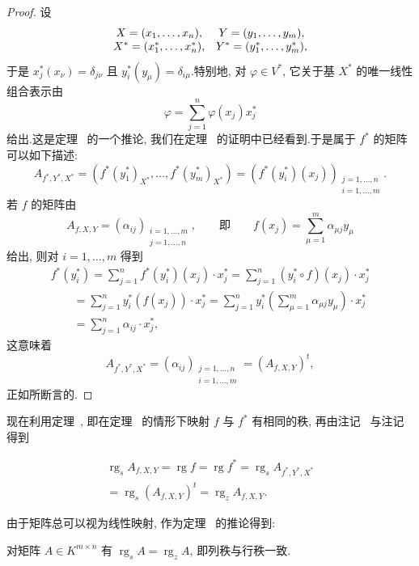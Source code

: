 \begin{proof}
设
\[
\begin{array}{c c}
X = (x_1, \ldots, x_n), & Y = (y_1, \ldots, y_m), \\
X^* = (x_1^*, \ldots, x_n^*), & Y^* = (y_1^*, \ldots, y_m^*),
\end{array}
\]
于是 $x_j^*(x_\nu) = \delta_{j\nu}$ 且 $y_i^*(y_\mu) = \delta_{i\mu}$.特别地, 对 $\varphi \in V^*$, 它关于基 $X^*$ 的唯一线性组合表示由
\[
\varphi = \sum_{j = 1}^{n}\varphi(x_j)x_j^*
\]
给出.这是定理~ 的一个推论, 我们在定理~ 的证明中已经看到.于是属于 $f^*$ 的矩阵可以如下描述:
\[
A_{f^*, Y^*, X^*} = \left(f^*(y_1^*)_{X^*}, \ldots, f^*(y_m^*)_{X^*}\right)
= \left(f^*(y_i^*)(x_j)\right)_{\substack{j = 1, \ldots, n\\ i = 1, \ldots, m}}\text{.}
\]
若 $f$ 的矩阵由
\[
A_{f, X, Y} = (\alpha_{ij})_{\substack{i = 1, \ldots, m\\ j = 1, \ldots, n}}, \qquad
\text{即} \qquad f(x_j) = \sum_{\mu = 1}^{m}\alpha_{\mu j}y_\mu
\]
给出, 则对 $i = 1, \ldots, m$ 得到
\[
\begin{array}{l}
f^*(y_i^*) = \sum_{j = 1}^{n}f^*(y_i^*)(x_j) \cdot x_j^* = \sum_{j = 1}^{n}(y_i^* \circ f)(x_j) \cdot x_j^* \\
\qquad = \sum_{j = 1}^{n}y_i^*\left(f(x_j)\right) \cdot x_j^* = \sum_{j = 1}^{n}y_i^*\left(\sum_{\mu = 1}^{m}\alpha_{\mu j}y_\mu\right) \cdot x_j^* \\
\qquad = \sum_{j = 1}^{n}\alpha_{ij} \cdot x_j^*,
\end{array}
\]
这意味着
\[
A_{f^*, Y^*, X^*} = (\alpha_{ij})_{\substack{j = 1, \ldots, n\\ i = 1, \ldots, m}} = (A_{f, X, Y})^t,
\]
正如所断言的.
\end{proof}

现在利用定理~, 即在定理~ 的情形下映射 $f$ 与 $f^*$ 有相同的秩, 再由注记~ 与注记~ 得到

\[
\begin{array}{c}
\operatorname{rg}_s A_{f, X, Y} = \operatorname{rg} f = \operatorname{rg} f^* = \operatorname{rg}_s A_{f^*, Y^*, X^*} \\
= \operatorname{rg}_s (A_{f, X, Y})^t = \operatorname{rg}_z A_{f, X, Y}\text{.}
\end{array}
\]

由于矩阵总可以视为线性映射, 作为定理~ 的推论得到:

\begin{corollary}\label{cor:3.2.10}
对矩阵 $A \in K^{m \times n}$ 有 $\operatorname{rg}_s A = \operatorname{rg}_z A$, 即列秩与行秩一致.
\end{corollary}

